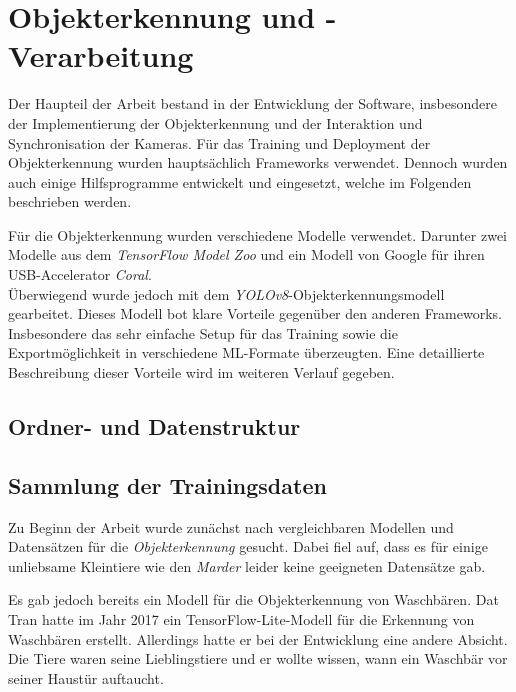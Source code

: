


\section{Objekterkennung und -Verarbeitung}

Der Haupteil der Arbeit bestand in der Entwicklung der Software, insbesondere der Implementierung der Objekterkennung und der Interaktion und Synchronisation der Kameras. Für das Training und Deployment der Objekterkennung wurden hauptsächlich Frameworks verwendet. Dennoch wurden auch einige Hilfsprogramme entwickelt und eingesetzt, welche im Folgenden beschrieben werden.

Für die Objekterkennung wurden verschiedene Modelle verwendet. Darunter zwei Modelle aus dem \textit{TensorFlow Model Zoo} und ein Modell von Google für ihren USB-Accelerator \textit{Coral}.
\\
Überwiegend wurde jedoch mit dem \textit{\ac{YOLO}v8}-Objekterkennungsmodell gearbeitet. Dieses Modell bot klare Vorteile gegenüber den anderen Frameworks. Insbesondere das sehr einfache Setup für das Training sowie die Exportmöglichkeit in verschiedene \ac{ML}-Formate überzeugten. Eine detaillierte Beschreibung dieser Vorteile wird im weiteren Verlauf gegeben.

\subsection{Ordner- und Datenstruktur} \label{cap:struktur}


\subsection{Sammlung der Trainingsdaten}

Zu Beginn der Arbeit wurde zunächst nach vergleichbaren Modellen und Datensätzen für die \textit{Objekterkennung} gesucht. Dabei fiel auf, dass es für einige unliebsame Kleintiere wie den \textit{Marder} leider keine geeigneten Datensätze gab.

Es gab jedoch bereits ein Modell für die Objekterkennung von Waschbären. Dat Tran hatte im Jahr 2017 ein TensorFlow-Lite-Modell für die Erkennung von Waschbären erstellt. Allerdings hatte er bei der Entwicklung eine andere Absicht. Die Tiere waren seine Lieblingstiere und er wollte wissen, wann ein Waschbär vor seiner Haustür auftaucht.
\cite{wasch_detect}

